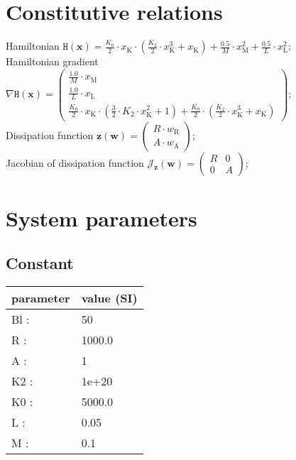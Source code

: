 \documentclass[11pt, oneside]{article}      %
\begin{document}
\section{Constitutive relations}
%
Hamiltonian $ \mathtt{H}(\mathbf{x}) = \frac{K_{0}}{2} \cdot x_{\mathrm{K}} \cdot \left(\frac{K_{2}}{2} \cdot x_{\mathrm{K}}^{3} + x_{\mathrm{K}}\right) + \frac{0.5}{M} \cdot x_{\mathrm{M}}^{2} + \frac{0.5}{L} \cdot x_{\mathrm{L}}^{2} ; $ 
%
\\
%
Hamiltonian gradient $ \nabla \mathtt{H}(\mathbf{x}) = \left(\begin{array}{c}\frac{1.0}{M} \cdot x_{\mathrm{M}}\\\frac{1.0}{L} \cdot x_{\mathrm{L}}\\\frac{K_{0}}{2} \cdot x_{\mathrm{K}} \cdot \left(\frac{3}{2} \cdot K_{2} \cdot x_{\mathrm{K}}^{2} + 1\right) + \frac{K_{0}}{2} \cdot \left(\frac{K_{2}}{2} \cdot x_{\mathrm{K}}^{3} + x_{\mathrm{K}}\right)\end{array}\right) ; $ 
%
\\
%
Dissipation function $ \mathbf{z}(\mathbf{w}) = \left(\begin{array}{c}R \cdot w_{\mathrm{R}}\\A \cdot w_{\mathrm{A}}\end{array}\right) ; $ 
%
\\
%
Jacobian of dissipation function $ \mathcal{J}_{\mathbf{z}}(\mathbf{w}) = \left(\begin{array}{cc}R & 0\\0 & A\end{array}\right) ; $ 
%
\\
%
%
\section{System parameters}
%
%
\subsection{Constant}
%
\begin{center}
%
\begin{tabular}{ll}
%
\hline
parameter & value (SI)
\\ \hline
Bl :& 50
\\
R :& 1000.0
\\
A :& 1
\\
K2 :& 1e+20
\\
K0 :& 5000.0
\\
L :& 0.05
\\
M :& 0.1
\\
\hline
\end{tabular}
%
\end{center}
%
\end{document}
